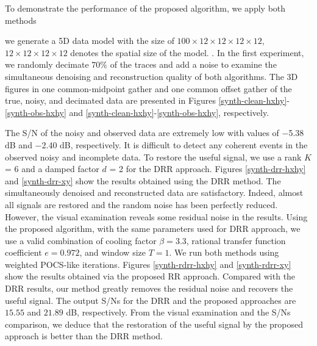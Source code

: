 To demonstrate the performance of the proposed algorithm, we apply both methods    

 we generate a 5D data model with the size of $100 \times 12 \times 12 \times 12 \times 12$,  $12 \times 12 \times 12 \times 12$ denotes the spatial size of the model. . In the first experiment, we randomly decimate $70\%$ of the traces and add a noise  to examine the simultaneous denoising and reconstruction quality of both algorithms. The 3D figures in one common-midpoint gather  and one common offset gather  of the true, noisy, and decimated data are presented in Figures \ref{synth-clean-hxhy}-\ref{synth-obs-hxhy} and \ref{synth-clean-hxhy}-\ref{synth-obs-hxhy}, respectively. 

The S/N of the noisy and observed data are extremely low with values of {$-$5.38 dB} and {$-$2.40 dB}, respectively. It is difficult to detect any coherent events in the observed noisy and incomplete data. To restore the useful signal, we use a rank {$K$ = 6} and a damped factor {$d$ = 2} for the DRR approach. Figures \ref{synth-drr-hxhy} and \ref{synth-drr-xy} show the results obtained using the DRR method. The simultaneously denoised and reconstructed data are satisfactory. Indeed, almost all signals are restored and the random noise has been perfectly reduced. However, the visual examination reveals some residual noise in the results. Using the proposed algorithm, with the same parameters used for DRR approach, we use a valid combination of cooling factor ${\beta = 3.3}$, rational transfer function coefficient ${e = 0.972}$, and window size ${T = 1}$. We run both methods using  weighted POCS-like iterations. Figures \ref{synth-rdrr-hxhy} and \ref{synth-rdrr-xy} show the results obtained via the proposed RR approach. Compared with the DRR results, our method greatly removes the residual noise and recovers the useful signal. The output S/Ns for the DRR and the proposed approaches are {$15.55$} and {$21.89$ dB}, respectively. From the visual examination and the S/Ns comparison, we deduce that the restoration of the useful signal by the proposed approach is better than the DRR method.


